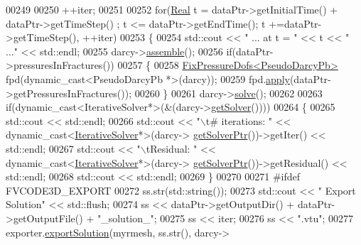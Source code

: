 \begin{DoxyCode}
00249 
00250         ++iter;
00251 
00252         \textcolor{keywordflow}{for}(\hyperlink{namespaceFVCode3D_a40c1f5588a248569d80aa5f867080e83}{Real} t = dataPtr->getInitialTime() + dataPtr->getTimeStep() ; t <= dataPtr->getEndTime(); t
      +=dataPtr->getTimeStep(), ++iter)
00253         \{
00254             std::cout << \textcolor{stringliteral}{" ... at t = "} << t << \textcolor{stringliteral}{" ..."} << std::endl;
00255             darcy->\hyperlink{classFVCode3D_1_1Problem_aa3f0a44084a56374f5ac7f242e0e45f7}{assemble}();
00256             \textcolor{keywordflow}{if}(dataPtr->pressuresInFractures())
00257             \{
00258                 \hyperlink{classFVCode3D_1_1FixPressureDofs}{FixPressureDofs<PseudoDarcyPb>} fpd(dynamic\_cast<PseudoDarcyPb
       *>(darcy));
00259                 fpd.\hyperlink{classFVCode3D_1_1FixPressureDofs_a3393776b99ad339672ba99cfc5c200e2}{apply}(dataPtr->getPressuresInFractures());
00260             \}
00261             darcy->\hyperlink{classFVCode3D_1_1Problem_a7ee30db5a251dc7a9778c821e49cf376}{solve}();
00262 
00263             \textcolor{keywordflow}{if}(dynamic\_cast<IterativeSolver*>(&(darcy->\hyperlink{classFVCode3D_1_1Problem_a39e64d24161ea699046d4e670fbc4eab}{getSolver}())))
00264             \{
00265                 std::cout << std::endl;
00266                 std::cout << \textcolor{stringliteral}{"\(\backslash\)t# iterations: "} << \textcolor{keyword}{dynamic\_cast<}\hyperlink{classFVCode3D_1_1IterativeSolver}{IterativeSolver}*\textcolor{keyword}{>}(darcy->
      \hyperlink{classFVCode3D_1_1Problem_a24f0f7e726e4c68a0eac87a4a4054823}{getSolverPtr}())->getIter() << std::endl;
00267                 std::cout << \textcolor{stringliteral}{"\(\backslash\)tResidual: "} << \textcolor{keyword}{dynamic\_cast<}\hyperlink{classFVCode3D_1_1IterativeSolver}{IterativeSolver}*\textcolor{keyword}{>}(darcy->
      \hyperlink{classFVCode3D_1_1Problem_a24f0f7e726e4c68a0eac87a4a4054823}{getSolverPtr}())->getResidual() << std::endl;
00268                 std::cout << std::endl;
00269             \}
00270 
00271 \textcolor{preprocessor}{#ifdef FVCODE3D\_EXPORT}
00272             ss.str(std::string());
00273             std::cout << \textcolor{stringliteral}{" Export Solution"} << std::flush;
00274             ss << dataPtr->getOutputDir() + dataPtr->getOutputFile() + \textcolor{stringliteral}{"\_solution\_"};
00275             ss << iter;
00276             ss << \textcolor{stringliteral}{".vtu"};
00277             exporter.\hyperlink{classFVCode3D_1_1ExporterVTU_a476a1dd02bcba8c31f0d99c7106d0c21}{exportSolution}(myrmesh, ss.str(), darcy->

\end{DoxyCode}
